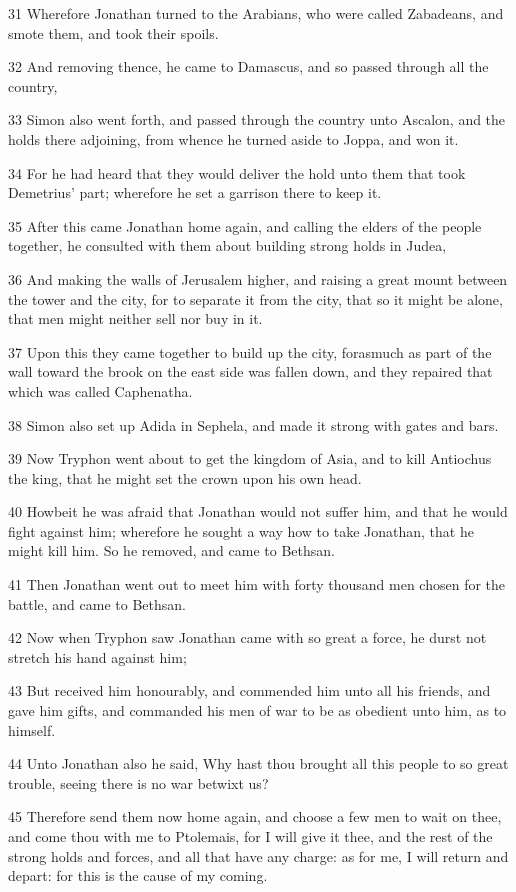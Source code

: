 \par 31 Wherefore Jonathan turned to the Arabians, who were called Zabadeans, and smote them, and took their spoils.
\par 32 And removing thence, he came to Damascus, and so passed through all the country,
\par 33 Simon also went forth, and passed through the country unto Ascalon, and the holds there adjoining, from whence he turned aside to Joppa, and won it.
\par 34 For he had heard that they would deliver the hold unto them that took Demetrius' part; wherefore he set a garrison there to keep it.
\par 35 After this came Jonathan home again, and calling the elders of the people together, he consulted with them about building strong holds in Judea,
\par 36 And making the walls of Jerusalem higher, and raising a great mount between the tower and the city, for to separate it from the city, that so it might be alone, that men might neither sell nor buy in it.
\par 37 Upon this they came together to build up the city, forasmuch as part of the wall toward the brook on the east side was fallen down, and they repaired that which was called Caphenatha.
\par 38 Simon also set up Adida in Sephela, and made it strong with gates and bars.
\par 39 Now Tryphon went about to get the kingdom of Asia, and to kill Antiochus the king, that he might set the crown upon his own head.
\par 40 Howbeit he was afraid that Jonathan would not suffer him, and that he would fight against him; wherefore he sought a way how to take Jonathan, that he might kill him. So he removed, and came to Bethsan.
\par 41 Then Jonathan went out to meet him with forty thousand men chosen for the battle, and came to Bethsan.
\par 42 Now when Tryphon saw Jonathan came with so great a force, he durst not stretch his hand against him;
\par 43 But received him honourably, and commended him unto all his friends, and gave him gifts, and commanded his men of war to be as obedient unto him, as to himself.
\par 44 Unto Jonathan also he said, Why hast thou brought all this people to so great trouble, seeing there is no war betwixt us?
\par 45 Therefore send them now home again, and choose a few men to wait on thee, and come thou with me to Ptolemais, for I will give it thee, and the rest of the strong holds and forces, and all that have any charge: as for me, I will return and depart: for this is the cause of my coming.
